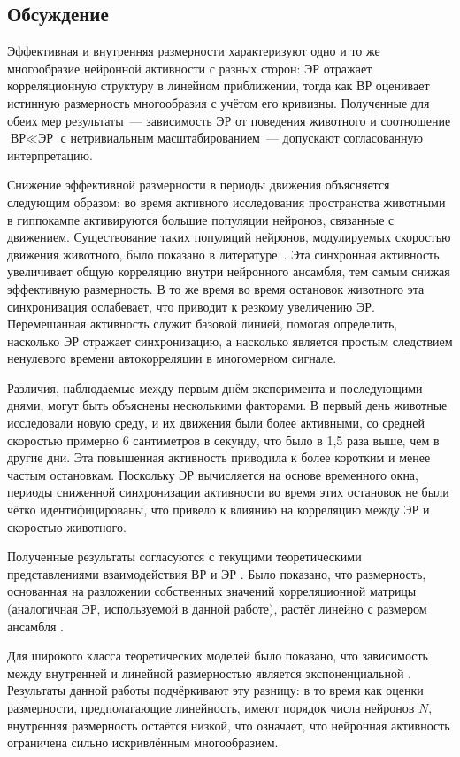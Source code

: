 \subsection{Обсуждение}\label{sec:dim_discussion}

Эффективная и внутренняя размерности характеризуют одно и то же многообразие нейронной активности с разных сторон: ЭР отражает корреляционную структуру в линейном приближении, тогда как ВР оценивает истинную размерность многообразия с учётом его кривизны. Полученные для обеих мер результаты~--- зависимость ЭР от поведения животного и соотношение $\text{ВР} \ll \text{ЭР}$ с нетривиальным масштабированием~--- допускают согласованную интерпретацию.

Снижение эффективной размерности в периоды движения объясняется следующим образом: во время активного исследования пространства животными в гиппокампе активируются большие популяции нейронов, связанные с движением. Существование таких популяций нейронов, модулируемых скоростью движения животного, было показано в литературе~\cite{Lu2009}. Эта синхронная активность увеличивает общую корреляцию внутри нейронного ансамбля, тем самым снижая эффективную размерность. В то же время во время остановок животного эта синхронизация ослабевает, что приводит к резкому увеличению ЭР. Перемешанная активность служит базовой линией, помогая определить, насколько ЭР отражает синхронизацию, а насколько является простым следствием ненулевого времени автокорреляции в многомерном сигнале.

Различия, наблюдаемые между первым днём эксперимента и последующими днями, могут быть объяснены несколькими факторами. В первый день животные исследовали новую среду, и их движения были более активными, со средней скоростью примерно 6 сантиметров в секунду, что было в 1,5 раза выше, чем в другие дни. Эта повышенная активность приводила к более коротким и менее частым остановкам. Поскольку ЭР вычисляется на основе временного окна, периоды сниженной синхронизации активности во время этих остановок не были чётко идентифицированы, что привело к влиянию на корреляцию между ЭР и скоростью животного.

Полученные результаты согласуются с текущими теоретическими представлениями взаимодействия ВР и ЭР \cite{Jazayeri2021}. Было показано, что размерность, основанная на разложении собственных значений корреляционной матрицы (аналогичная ЭР, используемой в данной работе), растёт линейно с размером ансамбля \cite{Mazzucato2016}.

Для широкого класса теоретических моделей было показано, что зависимость между внутренней и линейной размерностью является экспоненциальной \cite{De2023}. Результаты данной работы подчёркивают эту разницу: в то время как оценки размерности, предполагающие линейность, имеют порядок числа нейронов $N$, внутренняя размерность остаётся низкой, что означает, что нейронная активность ограничена сильно искривлённым многообразием.

